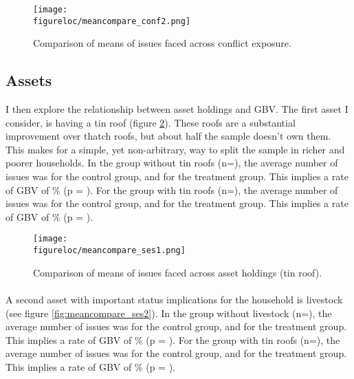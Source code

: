 \documentclass[11pt,a4paper]{scrartcl} %
\newcommand{\figureloc}{C:/Users/Koen/Dropbox/PhD/Papers/CongoGBV/Figures}
\begin{document}
\begin{figure}
  \texttt{[image: \\figureloc/meancompare\_conf2.png]}
  \caption{Comparison of means of issues faced across conflict exposure.}
  \label{fig:meancompare_conf2}
\end{figure}

\subsection*{Assets}
I then explore the relationship between asset holdings and GBV. The first asset I consider, is having a tin roof (figure \ref{fig:meancompare_ses1}). These roofs are a substantial improvement over thatch roofs, but about half the sample doesn't own them. This makes for a simple, yet non-arbitrary, way to split the sample in richer and poorer households.   In the group without tin roofs (n=), the average number of issues was  for the control group, and  for the treatment group. This implies a rate of GBV of \% (p = ). For the group with tin roofs (n=), the average number of issues was  for the control group, and  for the treatment group. This implies a rate of GBV of \% (p = ).

\begin{figure}
  \texttt{[image: \\figureloc/meancompare\_ses1.png]}
  \caption{Comparison of means of issues faced across asset holdings (tin roof).}
  \label{fig:meancompare_ses1}
\end{figure}

\paragraph{}
A second asset with important status implications for the household is livestock (see figure \ref{fig:meancompare_ses2}).  In the group without livestock (n=), the average number of issues was  for the control group, and  for the treatment group. This implies a rate of GBV of \% (p = ). For the group with tin roofs (n=), the average number of issues was  for the control group, and  for the treatment group. This implies a rate of GBV of \% (p = ).
\end{document}
